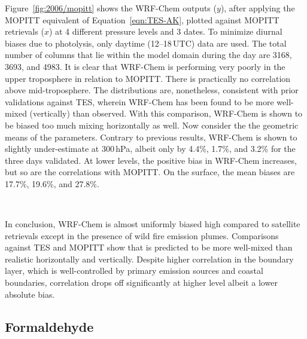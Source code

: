 
Figure~\ref{fig:2006/mopitt} shows the WRF-Chem  outputs ($y$), after applying the MOPITT equivalent of Equation~\ref{eqn:TES-AK}, plotted against MOPITT
retrievals ($x$) at 4 different pressure levels and 3 dates. To minimize diurnal biases due to photolysis, only daytime (12--18\,\unit{UTC}) data are used. The total number
of columns that lie within the model domain during the day are 3168, 3693, and 4983. It is clear that WRF-Chem is performing very poorly in the upper troposphere in relation
to MOPITT. There is practically no correlation above mid-troposphere. The distributions are, nonetheless, consistent with prior validations against TES, wherein WRF-Chem
 has been found to be more well-mixed (vertically) than observed. With this comparison, WRF-Chem is shown to be biased too much mixing horizontally as well.
Now consider the the geometric means of the parameters. Contrary to previous results, WRF-Chem is shown to slightly under-estimate  at 300\,\unit{hPa}, albeit
only by 4.4\%, 1.7\%, and 3.2\% for the three days validated. At lower levels, the positive bias in WRF-Chem increases, but so are the correlations with MOPITT. On the
surface, the mean biases are 17.7\%, 19.6\%, and 27.8\%.

\,

In conclusion, WRF-Chem  is almost uniformly biased high compared to satellite retrievals except in the presence of wild fire emission plumes. Comparisons against
TES and MOPITT show that  is predicted to be more well-mixed than realistic horizontally and vertically. Despite higher correlation in the boundary layer, which is
well-controlled by primary emission sources and coastal boundaries, correlation drops off significantly at higher level albeit a lower absolute bias.

\subsection{Formaldehyde}\label{ssec:2006/gen/form}


